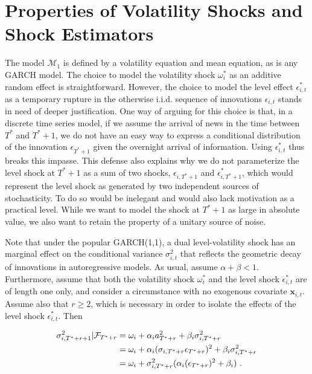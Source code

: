 \documentclass[11pt,3p,review,authoryear]{elsarticle}
\newcommand{\x}{\textbf{x}}
\def\mc#1{\mathcal{#1}} %
\def\mc#1{\mathcal{#1}}
\theoremstyle{definition}
\begin{document}
\section{Properties of Volatility Shocks and Shock Estimators}\label{SVF_properties}

The model $\mc{M}_1$ is defined by a volatility equation and mean equation, as is any GARCH model.  The choice to model the volatility shock $\omega^{*}_{i}$ as an additive random effect is straightforward.  However, the choice to model the level effect $\epsilon^{*}_{i,t}$ as a temporary rupture in the otherwise i.i.d. sequence of innovations $\epsilon_{i,t}$ stands in need of deeper justification.  One way of arguing for this choice is that, in a discrete time series model, if we assume the arrival of news in the time between $T^{*}$ and $T^{*}+1$, we do not have an easy way to express a conditional distribution of the innovation $\epsilon_{T^{*}+1}$ given the overnight arrival of information.  Using $\epsilon^{*}_{i,t}$ thus breaks this impasse.  This defense also explains why we do not parameterize the level shock at $T^{*}+1$ as a sum of two shocks, $\epsilon_{i,T^{*}+1}$ and $\epsilon^{*}_{i,T^{*}+1}$, which would represent the level shock as generated by two independent sources of stochasticity.  To do so would be inelegant and would also lack motivation as a practical level.  While we want to model the shock at $T^{*}+1$ as large in absolute value, we also want to retain the property of a unitary source of noise.

Note that under the popular GARCH(1,1), a dual level-volatility shock has an marginal effect on the conditional variance $\sigma^{2}_{i,t}$ that reflects the geometric decay of innovations in autoregressive models.  As usual, assume $\alpha+\beta < 1$.  Furthermore, assume that both the volatility shock $\omega^{*}_{i}$ and the level shock $\epsilon^{*}_{i,t}$ are of length one only, and consider a circumstance with no exogenous covariate $\x_{i,t}$. Assume also that $r\geq 2$, which is necessary in order to isolate the effects of the level shock $\epsilon^{*}_{i,t}$.  Then

\begin{align}
\sigma^{2}_{i,T^{*}+r+1} | \mathcal{F}_{T^{*}+r} & = \omega_{i} + \alpha_{i} a_{T^{*}+r}^{2} + \beta_{i}\sigma^{2}_{i,T^{*}+r} \label{eq0}\\
& = \omega_{i} + \alpha_{i}(\sigma_{i,T^{*}+r}\epsilon_{T^{*}+r})^{2} + \beta_{i}\sigma^{2}_{i,T^{*}+r}\notag \\
& = \omega_{i} + \sigma^{2}_{i,T^{*}+r}(\alpha_{i} (\epsilon_{T^{*}+r})^{2} + \beta_{i}) \text{ .}\notag 
\end{align}
\end{document}
